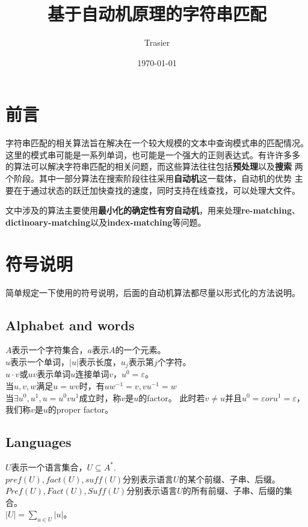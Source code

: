\documentclass[UTF8]{ctexart}
\theoremstyle{definition}
\theoremstyle{remark}
\numberwithin{equation}{subsection}
\newcommand{\Emph}{\textbf}
\newcommand{\Suff}{\textit{Suff}}
\begin{document}
\title{\Huge 基于自动机原理的字符串匹配}
\vspace{2cm}
\author{\Large Trasier}
\date{\today}
\maketitle


\section{前言}

	字符串匹配的相关算法旨在解决在一个较大规模的文本中查询模式串的匹配情况。
	这里的模式串可能是一系列单词，也可能是一个强大的正则表达式。有许许多多
	的算法可以解决字符串匹配的相关问题，而这些算法往往包括\Emph{预处理}以及\Emph{搜索}
	两个阶段。其中一部分算法在搜索阶段往往采用\Emph{自动机}这一载体，自动机的优势
	主要在于通过状态的跃迁加快查找的速度，同时支持在线查找，可以处理大文件。
	
	文中涉及的算法主要使用\Emph{最小化的确定性有穷自动机}，用来处理\Emph{re-matching}、
    \Emph{dictinoary-matching}以及\Emph{index-matching}等问题。

\section{符号说明}
	
	简单规定一下使用的符号说明，后面的自动机算法都尽量以形式化的方法说明。
	
\subsection{Alphabet and words}
	
	\noindent
    $A$表示一个字符集合，$a$表示$A$的一个元素。				\\
	$u$表示一个单词，$|u|$表示长度，$u_j$表示第$j$个字符。	\\
	$u \cdot v$或$uv$表示单词$u$连接单词$v$，$u^0 = \varepsilon$。\\
	当$u,v,w$满足$u = wv$时，有$uw^{-1} = v, vu^{-1} = w$	\\
	当$\exists u^0, u^1, u=u^0vu^1$成立时，称$v$是$u$的factor。
	此时若$v \neq u$并且$u^0=\varepsilon or u^1=\varepsilon$，我们称$v$是$u$的proper factor。
	
\subsection{Languages}
	
	\noindent
	$U$表示一个语言集合，$U \subseteq A^*$.	\\
	$pref(U), fact(U), suff(U)$分别表示语言$U$的某个前缀、子串、后缀。	\\
	$Pref(U), Fact(U), \Suff(U)$分别表示语言$U$的所有前缀、子串、后缀的集合。	\\
	$|U| = \sum_{u \in U} |u|$。
	
\end{document}
